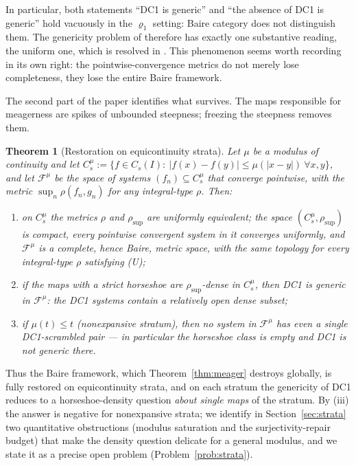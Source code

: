 \documentclass[11pt]{article}
\newtheorem{theorem}{Theorem}[section]
\newcommand{\I}{I}
\newcommand{\Cs}{C_s(\I)}
\newcommand{\rsup}{\rho_{\sup}}
\begin{document}
In particular, both statements ``DC1 is generic'' and ``the absence of DC1 is
generic'' hold vacuously in the $\varrho_1$ setting: Baire category does not
distinguish them.  The genericity problem of \cite{BR} therefore has exactly one
substantive reading, the uniform one, which is resolved in \cite{companion}.  This
phenomenon seems worth recording in its own right: the pointwise-convergence
metrics do not merely lose completeness, they lose the entire Baire framework.

The second part of the paper identifies what survives.  The maps responsible for
meagerness are spikes of unbounded steepness; freezing the steepness removes them.

\begin{theorem}[Restoration on equicontinuity strata]\label{thm:strata}
Let $\mu$ be a modulus of continuity and let
$C^\mu_s:=\{f\in\Cs:\ |f(x)-f(y)|\le\mu(|x-y|)\ \forall x,y\}$, and let
$\mathcal F^\mu$ be the space of systems $(f_n)\subseteq C^\mu_s$ that converge
pointwise, with the metric $\sup_n\rho(f_n,g_n)$ for any integral-type $\rho$.
Then:
\begin{enumerate}
\item[(i)] on $C^\mu_s$ the metrics $\rho$ and $\rsup$ are uniformly equivalent;
the space $(C^\mu_s,\rsup)$ is compact, every pointwise convergent system in it
converges uniformly, and $\mathcal F^\mu$ is a complete, hence Baire, metric
space, with the same topology for every integral-type $\rho$ satisfying (U);
\item[(ii)] if the maps with a strict horseshoe are $\rsup$-dense in
$C^\mu_s$, then DC1 is generic in $\mathcal F^\mu$: the DC1 systems contain a
relatively open dense subset;
\item[(iii)] if $\mu(t)\le t$ (nonexpansive stratum), then \emph{no} system in
$\mathcal F^\mu$ has even a single DC1-scrambled pair --- in particular the
horseshoe class is empty and DC1 is \emph{not} generic there.
\end{enumerate}
\end{theorem}

Thus the Baire framework, which Theorem~\ref{thm:meager} destroys globally, is
fully restored on equicontinuity strata, and on each stratum the genericity of
DC1 reduces to a horseshoe-density question \emph{about single maps} of the
stratum.  By (iii) the answer is negative for nonexpansive strata; we identify in
Section~\ref{sec:strata} two quantitative obstructions (modulus saturation and
the surjectivity-repair budget) that make the density question delicate for a
general modulus, and we state it as a precise open problem
(Problem~\ref{prob:strata}).
\end{document}
